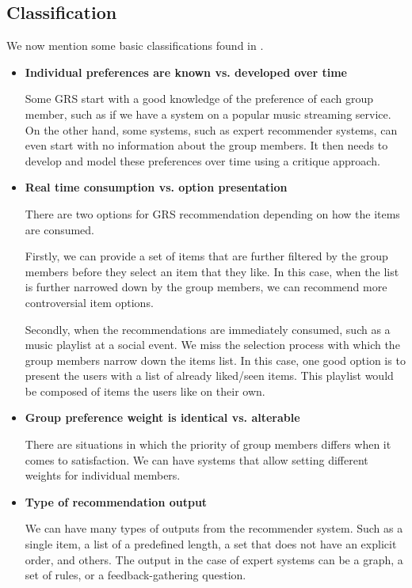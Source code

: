 \subsection{Classification}
We now mention some basic classifications found in \cite{masthoff_2011_group_rec_systems}.
\begin{itemize}
    \item \textbf{Individual preferences are known vs. developed over time}
    
    Some GRS start with a good knowledge of the preference of each group member, such as if we have a system on a popular music streaming service. On the other hand, some systems, such as expert recommender systems, can even start with no information about the group members. It then needs to develop and model these preferences over time using a critique approach.
    
    \item \textbf{Real time consumption vs. option presentation}

    There are two options for GRS recommendation depending on how the items are consumed.
    
    Firstly, we can provide a set of items that are further filtered by the group members before they select an item that they like. In this case, when the list is further narrowed down by the group members, we can recommend more controversial item options.
    
    Secondly, when the recommendations are immediately consumed, such as a music playlist at a social event. We miss the selection process with which the group members narrow down the items list. In this case, one good option is to present the users with a list of already liked/seen items. This playlist would be composed of items the users like on their own.
    
    
    
    \item \textbf{Group preference weight is identical vs. alterable}
    
    There are situations in which the priority of group members differs when it comes to satisfaction. We can have systems that allow setting different weights for individual members.
    
    \item \textbf{Type of recommendation output}
    
    We can have many types of outputs from the recommender system. Such as a single item, a list of a predefined length, a set that does not have an explicit order, and others. The output in the case of expert systems can be a graph, a set of rules, or a feedback-gathering question.
    

\end{itemize}
